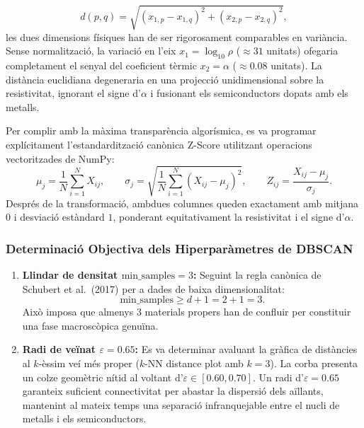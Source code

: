 \documentclass[a4paper,11pt]{article}
\begin{document}
\begin{equation}
    d(p, q) = \sqrt{(x_{1,p} - x_{1,q})^2 + (x_{2,p} - x_{2,q})^2},
\end{equation}
les dues dimensions físiques han de ser rigorosament comparables en variància.
Sense normalització, la variació en l'eix $x_1 = \log_{10}\rho$ ($\approx 31$ unitats) ofegaria completament el senyal del coeficient tèrmic $x_2 = \alpha$ ($\approx 0.08$ unitats). La distància euclidiana degeneraria en una projecció unidimensional sobre la resistivitat, ignorant el signe d'$\alpha$ i fusionant els semiconductors dopats amb els metalls.

Per complir amb la màxima transparència algorísmica, es va programar explícitament l'estandardització canònica Z-Score utilitzant operacions vectoritzades de NumPy:
\begin{equation}
    \mu_j = \frac{1}{N} \sum_{i=1}^N X_{ij}, \qquad \sigma_j = \sqrt{\frac{1}{N} \sum_{i=1}^N (X_{ij} - \mu_j)^2}, \qquad Z_{ij} = \frac{X_{ij} - \mu_j}{\sigma_j}.
\end{equation}
Després de la transformació, ambdues columnes queden exactament amb mitjana $0$ i desviació estàndard $1$, ponderant equitativament la resistivitat i el signe d'$\alpha$.

\subsubsection{Determinació Objectiva dels Hiperparàmetres de DBSCAN}

\begin{enumerate}
    \item \textbf{Llindar de densitat $\text{min\_samples} = 3$:} Seguint la regla canònica de Schubert et al.\ (2017) per a dades de baixa dimensionalitat:
    \begin{equation}
        \text{min\_samples} \ge d + 1 = 2 + 1 = 3.
    \end{equation}
    Això imposa que almenys 3 materials propers han de confluir per constituir una fase macroscòpica genuïna.
    \item \textbf{Radi de veïnat $\varepsilon = 0.65$:} Es va determinar avaluant la gràfica de distàncies al $k$-èssim veí més proper ($k$-NN distance plot amb $k = 3$). La corba presenta un colze geomètric nítid al voltant d'$\varepsilon \in [0.60, 0.70]$. Un radi d'$\varepsilon = 0.65$ garanteix suficient connectivitat per abastar la dispersió dels aïllants, mantenint al mateix temps una separació infranquejable entre el nucli de metalls i els semiconductors.
\end{enumerate}
\end{document}
